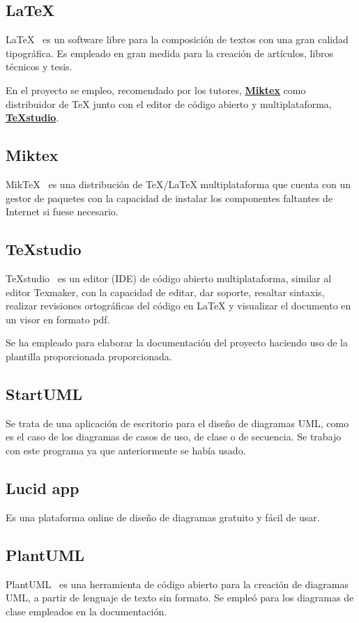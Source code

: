 \subsection{LaTeX}
LaTeX~\cite{pagina_latex} es un software libre para la composición de textos con una gran calidad tipográfica. Es empleado en gran medida para la creación de artículos, libros técnicos y tesis. 

En el proyecto se empleo, recomendado por los tutores, \textbf{\href{https://miktex.org/}{Miktex}} como distribuidor de TeX junto con el editor de código abierto y multiplataforma, \textbf{\href{https://www.texstudio.org/}{TeXstudio}}. 

\subsection{Miktex} 
MikTeX~\cite{pagina_miktex} es una distribución de TeX/LaTeX multiplataforma que cuenta con un gestor de paquetes con la capacidad de instalar los componentes faltantes de Internet si fuese necesario.

\subsection{TeXstudio}
TeXstudio~\cite{pagina_texstudio} es un editor (IDE) de código abierto multiplataforma, similar al editor Texmaker, con la capacidad de editar, dar soporte, resaltar sintaxis, realizar revisiones ortográficas del código en LaTeX y visualizar el documento en un visor en formato pdf.

Se ha empleado para elaborar la documentación del proyecto haciendo uso de la plantilla proporcionada proporcionada.

\subsection{StartUML}
Se trata de una aplicación de escritorio para el diseño de diagramas UML, como es el caso de los diagramas de casos de uso, de clase o de secuencia. Se trabajo con este programa ya que anteriormente se había usado.

\subsection{Lucid app}
Es una plataforma online de diseño de diagramas gratuito y fácil de usar.

\subsection{PlantUML}
PlantUML~\cite{pagina_PlantUML} es una herramienta de código abierto para la creación de diagramas UML, a partir de lenguaje de texto sin formato. Se empleó para los diagramas de clase empleados en la documentación.

